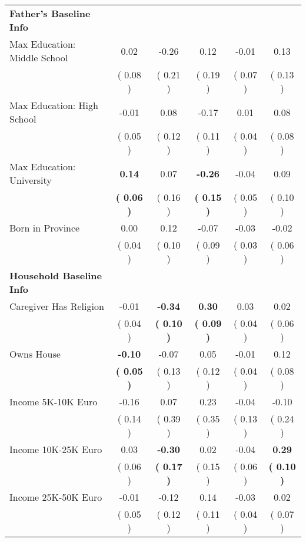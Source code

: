 \begin{table}[H]
{\begin{tabular}{lccccc}
\midrule
\textbf{Father's Baseline Info} \\
\quad Max Education: Middle School &      0.02 &     -0.26 &      0.12 &     -0.01 &      0.13 \\
\quad  & (     0.08 ) & (     0.21 )  & (     0.19 )  & (     0.07 ) & (     0.13 ) \\
\quad Max Education: High School &     -0.01 &      0.08 &     -0.17 &      0.01 &      0.08 \\
\quad  & (     0.05 ) & (     0.12 )  & (     0.11 )  & (     0.04 ) & (     0.08 ) \\
\quad Max Education: University & \textbf{     0.14} &      0.07 & \textbf{    -0.26} &     -0.04 &      0.09 \\
\quad  & \textbf{(     0.06 )} & (     0.16 )  & \textbf{(     0.15 )}  & (     0.05 ) & (     0.10 ) \\
\quad Born in Province &      0.00 &      0.12 &     -0.07 &     -0.03 &     -0.02 \\
\quad  & (     0.04 ) & (     0.10 )  & (     0.09 )  & (     0.03 ) & (     0.06 ) \\
\midrule
\textbf{Household Baseline Info} \\
\quad Caregiver Has Religion &     -0.01 & \textbf{    -0.34} & \textbf{     0.30} &      0.03 &      0.02 \\
\quad  & (     0.04 ) & \textbf{(     0.10 )}  & \textbf{(     0.09 )}  & (     0.04 ) & (     0.06 ) \\
\quad Owns House & \textbf{    -0.10} &     -0.07 &      0.05 &     -0.01 &      0.12 \\
\quad  & \textbf{(     0.05 )} & (     0.13 )  & (     0.12 )  & (     0.04 ) & (     0.08 ) \\
\quad Income 5K-10K Euro &     -0.16 &      0.07 &      0.23 &     -0.04 &     -0.10 \\
\quad  & (     0.14 ) & (     0.39 )  & (     0.35 )  & (     0.13 ) & (     0.24 ) \\
\quad Income 10K-25K Euro &      0.03 & \textbf{    -0.30} &      0.02 &     -0.04 & \textbf{     0.29} \\
\quad  & (     0.06 ) & \textbf{(     0.17 )}  & (     0.15 )  & (     0.06 ) & \textbf{(     0.10 )} \\
\quad Income 25K-50K Euro &     -0.01 &     -0.12 &      0.14 &     -0.03 &      0.02 \\
\quad  & (     0.05 ) & (     0.12 )  & (     0.11 )  & (     0.04 ) & (     0.07 ) \\

\end{tabular}}
\end{table}
